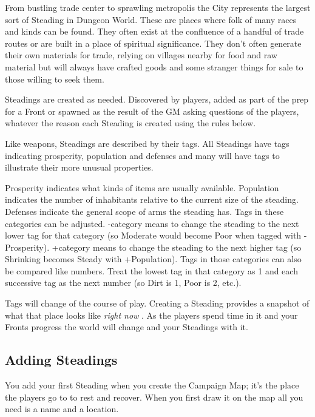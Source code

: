  

From bustling trade center to sprawling metropolis the City represents the largest sort of Steading in Dungeon World. These are places where folk of many races and kinds can be found. They often exist at the confluence of a handful of trade routes or are built in a place of spiritual significance. They don't often generate their own materials for trade, relying on villages nearby for food and raw material but will always have crafted goods and some stranger things for sale to those willing to seek them.

 

Steadings are created as needed. Discovered by players, added as part of the prep for a Front or spawned as the result of the GM asking questions of the players, whatever the reason each Steading is created using the rules below.

 

Like weapons, Steadings are described by their tags. All Steadings have tags indicating prosperity, population and defenses and many will have tags to illustrate their more unusual properties.

 

Prosperity indicates what kinds of items are usually available. Population indicates the number of inhabitants relative to the current size of the steading. Defenses indicate the general scope of arms the steading has. Tags in these categories can be adjusted. -category means to change the steading to the next lower tag for that category (so Moderate would become Poor when tagged with -Prosperity). +category means to change the steading to the next higher tag (so Shrinking becomes Steady with +Population). Tags in those categories can also be compared like numbers. Treat the lowest tag in that category as 1 and each successive tag as the next number (so Dirt is 1, Poor is 2, etc.).

 

Tags will change of the course of play. Creating a Steading provides a snapshot of what that place looks like {\em right now} . As the players spend time in it and your Fronts progress the world will change and your Steadings with it.

 
\subsection{Adding Steadings}   
 

You add your first Steading when you create the Campaign Map; it's the place the players go to to rest and recover. When you first draw it on the map all you need is a name and a location.


